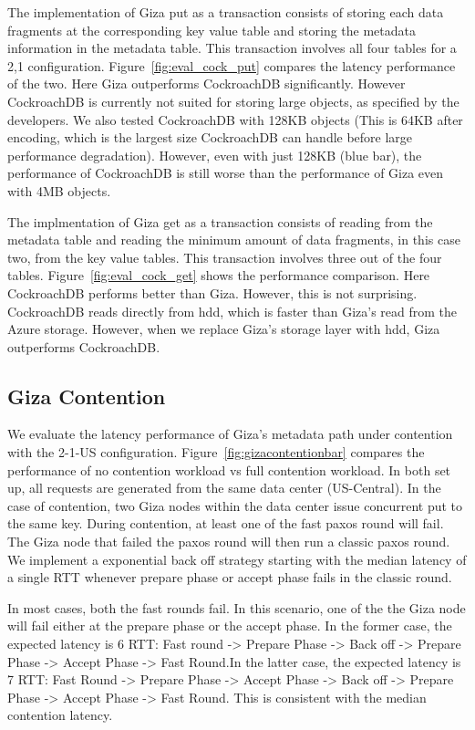 The implementation of Giza put as a transaction consists of storing each data fragments at the corresponding key value table and storing the metadata information in the metadata table. This transaction involves all four tables for a 2,1 configuration. Figure~\ref{fig:eval_cock_put} compares the latency performance of the two. Here Giza outperforms CockroachDB significantly.
However CockroachDB is currently not suited for storing large objects, as specified by the developers. We also tested CockroachDB with 128KB objects (This is 64KB after encoding, which is the largest size CockroachDB can handle before large performance degradation). However, even with just 128KB (blue bar), the performance of CockroachDB is still worse than the performance of Giza even with 4MB objects.

The implmentation of Giza get as a transaction consists of reading from the metadata table and reading the minimum amount of data fragments, in this case two, from the key value tables. This transaction involves three out of the four tables. Figure~\ref{fig:eval_cock_get} shows the performance comparison. Here CockroachDB performs better than Giza. However, this is not surprising. CockroachDB reads directly from hdd, which is faster than Giza's read from the Azure storage. However, when we replace Giza's storage layer with hdd, Giza outperforms CockroachDB.

\subsection{Giza Contention}

We evaluate the latency performance of Giza’s metadata path under contention with the 2-1-US configuration. Figure~\ref{fig:gizacontentionbar} compares the performance of no contention workload vs full contention workload. In both set up, all requests are generated from the same data center (US-Central). In the case of contention, two Giza nodes within the data center issue concurrent put to the same key. During contention, at least one of the fast paxos round will fail. The Giza node that failed the paxos round will then run a classic paxos round. We implement a exponential back off strategy starting with the median latency of a single RTT whenever prepare phase or accept phase fails in the classic round. 

In most cases, both the fast rounds fail. In this scenario, one of the the Giza node will fail either at the prepare phase or the accept phase. In the former case, the expected latency is 6 RTT: Fast round -> Prepare Phase -> Back off -> Prepare Phase -> Accept Phase -> Fast Round.In the latter case, the expected latency is 7 RTT: Fast Round -> Prepare Phase -> Accept Phase -> Back off -> Prepare Phase -> Accept Phase -> Fast Round. This is consistent with the median contention latency.

